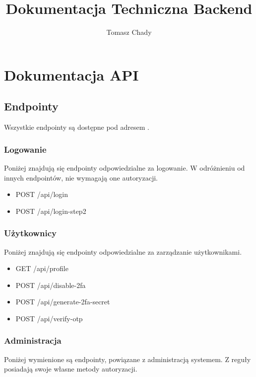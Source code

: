 \documentclass{documentation}
\title{Dokumentacja Techniczna Backend}
\author{Tomasz Chady}
\begin{document}
\maketitle

\tableofcontents

\section{Dokumentacja API}

\subsection{Endpointy}

Wszystkie endpointy są dostępne pod adresem .

\subsubsection{Logowanie}

Poniżej znajdują się endpointy odpowiedzialne za logowanie.
W odróżnieniu od innych endpointów, nie wymagają one autoryzacji.

\begin{itemize}
    \item POST /api/login
    \item POST /api/login-step2
\end{itemize}

\subsubsection{Użytkownicy}

Poniżej znajdują się endpointy odpowiedzialne za zarządzanie użytkownikami.

\begin{itemize}
    \item GET /api/profile
    \item POST /api/disable-2fa
    \item POST /api/generate-2fa-secret
    \item POST /api/verify-otp
\end{itemize}

\subsubsection{Administracja}

Poniżej wymienione są endpointy, powiązane z administracją systemem.
Z reguły posiadają swoje własne metody autoryzacji.
\end{document}
